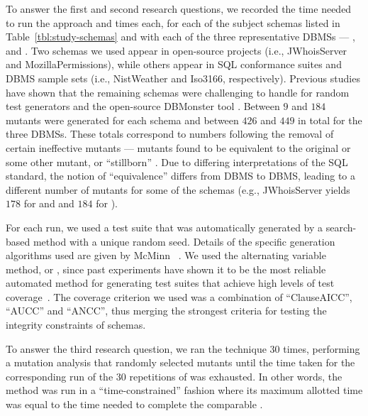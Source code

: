 \begin{sloppypar}
 To answer the first and second research \mbox{questions}, we recorded the time needed to run the \Original approach and  times each, for each of the subject schemas listed in Table~\ref{tbl:study-schemas} and with each of the three representative DBMSs --- \HyperSQL, \Postgres and \SQLite.  Two schemas we used appear in open-source projects (i.e., JWhoisServer and MozillaPermissions), while others appear in SQL conformance suites and DBMS sample sets (i.e., NistWeather and Iso3166, respectively). Previous studies have shown that the remaining schemas were challenging to handle for random test generators \cite{McMinn2015} and the open-source DBMonster tool \cite{Kapfhammer2013}.  Between $9$ and $184$ mutants were generated for each schema and between $426$ and $449$ in total for the three DBMSs. These totals correspond to numbers following the removal of certain ineffective mutants --- mutants found to be equivalent to the original or some other mutant, or ``stillborn'' \cite{Wright2014}. Due to differing interpretations of the SQL standard, the notion of ``equivalence'' differs from DBMS to DBMS, leading to a different number of mutants for some of the schemas (e.g., JWhoisServer yields $178$ for \HyperSQL and \Postgres and $184$ for \SQLite).
\end{sloppypar}


For each run, we used a test suite that was automatically generated by a search-based method with a unique random seed.  Details of the specific generation algorithms used are given by McMinn \etal~\cite{McMinn2015}. We used the alternating variable method, or \AVM, since past experiments have shown it to be the most reliable automated method for generating test suites that achieve high levels of test coverage~\cite{McMinn2015}. The coverage criterion we used was a combination of ``ClauseAICC'', ``AUCC'' and ``ANCC'', thus merging the strongest criteria for testing the integrity constraints of schemas.


To answer the third research question, we ran the \Original technique $30$ times, performing a mutation analysis that randomly selected mutants until the time taken for the corresponding run of the $30$ repetitions of \vma was exhausted.
%
In other words, the \Original method was run in a ``time-constrained'' fashion where its maximum allotted time was equal to the time needed to complete the comparable \vma.

